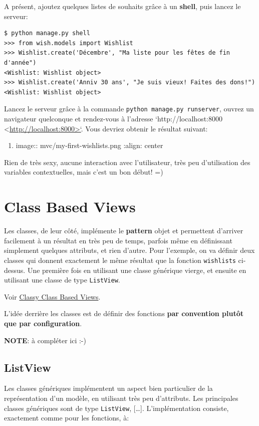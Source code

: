 \documentclass[11pt]{amsbook}
\newcommand{\admonition}[2]{\textbf{#1}: {#2}}
\begin{document}
A présent, ajoutez quelques listes de souhaits grâce à un \textbf{shell}, puis lancez le serveur:


\begin{verbatim}
$ python manage.py shell
>>> from wish.models import Wishlist
>>> Wishlist.create('Décembre', "Ma liste pour les fêtes de fin d'année")
<Wishlist: Wishlist object>
>>> Wishlist.create('Anniv 30 ans', "Je suis vieux! Faites des dons!")
<Wishlist: Wishlist object>
\end{verbatim}

Lancez le serveur grâce à la commande \texttt{python manage.py runserver}, ouvrez un navigateur quelconque et rendez-vous à l’adresse `http://localhost:8000 <\href{http://localhost:8000>`}{http://localhost:8000>`}. Vous devriez obtenir le résultat suivant:


\begin{enumerate}

\item{image:: mvc/my-first-wishlists.png
:align: center}

\end{enumerate}


Rien de très sexy, aucune interaction avec l’utilisateur, très peu d’utilisation des variables contextuelles, mais c’est un bon début! =)


\hypertarget{x-class-based-views}{\section{Class Based Views}}
Les classes, de leur côté, implémente le \textbf{pattern} objet et permettent d’arriver facilement à un résultat en très peu de temps, parfois même en définissant simplement quelques attributs, et rien d’autre. Pour l’exemple, on va définir deux classes qui donnent exactement le même résultat que la fonction \texttt{wishlists} ci-dessus. Une première fois en utilisant une classe générique vierge, et ensuite en utilisant une classe de type \texttt{ListView}.


Voir \href{https://ccbv.co.uk/}{Classy Class Based Views}.


L’idée derrière les classes est de définir des fonctions \textbf{par convention plutôt que par configuration}.


\admonition{NOTE}{à compléter ici :-)}
\hypertarget{x-listview}{\subsection{ListView}}
Les classes génériques implémentent un aspect bien particulier de la représentation d’un modèle, en utilisant très peu d’attributs. Les principales classes génériques sont de type \texttt{ListView}, […​]. L’implémentation consiste, exactement comme pour les fonctions, à:
\end{document}

